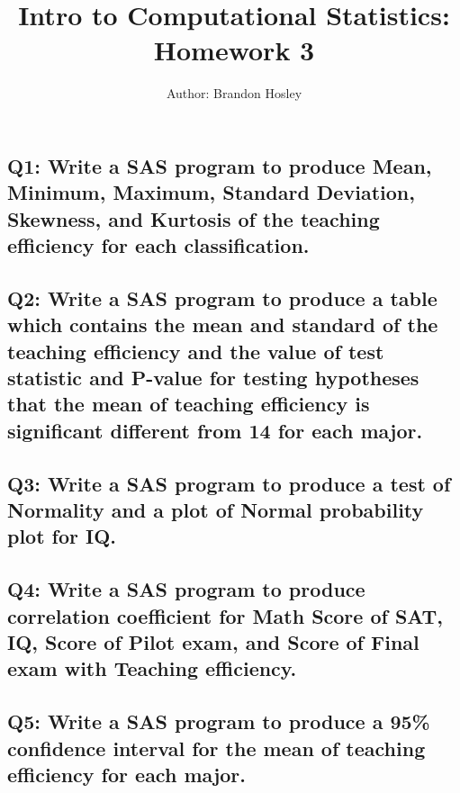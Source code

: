 \documentclass[a4paper,man,natbib]{apa6}
\title{Intro to Computational Statistics: Homework 3}
\author{Author: Brandon Hosley}
\affiliation{Instructor: Liang Kong, Ph.D}
\begin{document}
\maketitle
\singlespacing
	
\subsection*{Q1: Write a SAS program to produce Mean, Minimum, Maximum, Standard Deviation, Skewness, and Kurtosis of the teaching efficiency for each classification.}

\subsection*{Q2: Write a SAS program to produce a table which contains the mean and standard of the teaching efficiency and the value of test statistic and P-value for testing hypotheses that the mean of teaching efficiency is significant different from 14 for each major.}

\subsection*{Q3: Write a SAS program to produce a test of Normality and a plot of Normal probability plot for IQ.}

\subsection*{Q4: Write a SAS program to produce correlation coefficient for Math Score of SAT, IQ, Score of Pilot exam, and Score of Final exam with Teaching efficiency.}

\subsection*{Q5: Write a SAS program to produce  a 95\% confidence interval for the mean of teaching efficiency for each major.}
\end{document}
